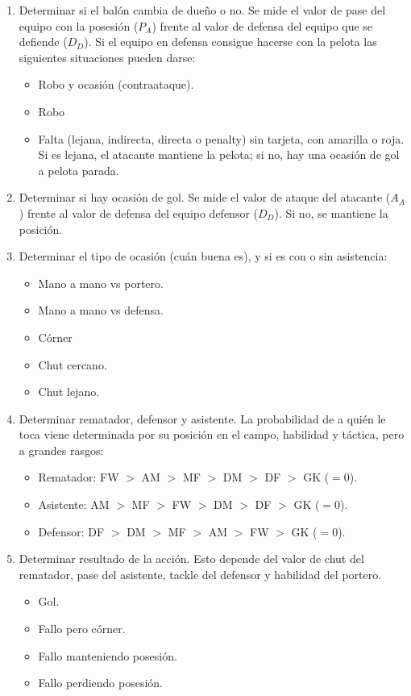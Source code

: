 \documentclass[a4paper,9pt]{article}
\begin{document}
\begin{enumerate}
\item Determinar si el bal\'on cambia de dueño o no. Se mide el valor de pase del equipo con la posesi\'on ($P_A$) frente al valor de defensa del equipo que se defiende ($D_D$). Si el equipo en defensa consigue hacerse con la pelota las siguientes situaciones pueden darse:
\begin{itemize}
\item Robo y ocasi\'on (contraataque).
\item Robo
\item Falta (lejana, indirecta, directa o penalty) sin tarjeta, con amarilla o roja. Si es lejana, el atacante mantiene la pelota; si no, hay una ocasi\'on de gol a pelota parada.
\end{itemize}
\item Determinar si hay ocasi\'on de gol. Se mide el valor de ataque del atacante ($A_A$) frente al valor de defensa del equipo defensor ($D_D$). Si no, se mantiene la posici\'on.
\item Determinar el tipo de ocasi\'on (cu\'an buena es), y si es con o sin asistencia:
\begin{itemize}
\item Mano a mano vs portero.
\item Mano a mano vs defensa.
\item C\'orner
\item Chut cercano.
\item Chut lejano.
\end{itemize}
\item Determinar rematador, defensor y asistente. La probabilidad de a qui\'en le toca viene determinada por su posici\'on en el campo, habilidad y táctica, pero a grandes rasgos:
\begin{itemize}
\item Rematador: FW $>$ AM $>$ MF $>$ DM $>$ DF $>$ GK ($=0$).
\item Asistente: AM $>$ MF $>$ FW $>$ DM $>$ DF $>$ GK ($=0$).
 \item Defensor: DF $>$ DM $>$ MF $>$ AM $>$ FW $>$ GK ($=0$).
\end{itemize}
\item Determinar resultado de la acci\'on. Esto depende del valor de chut del rematador, pase del asistente, tackle del defensor y habilidad del portero.
\begin{itemize}
\item Gol.
\item Fallo pero c\'orner.
\item Fallo manteniendo posesi\'on.
\item Fallo perdiendo posesi\'on.
\end{itemize}
\end{enumerate}
\end{document}
